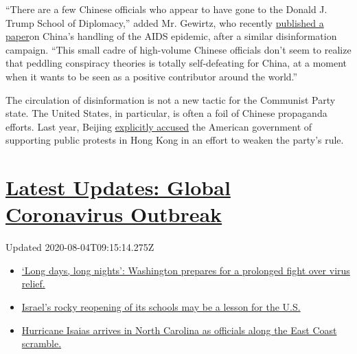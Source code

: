 ``There are a few Chinese officials who appear to have gone to the
Donald J. Trump School of Diplomacy,'' added Mr. Gewirtz, who recently
\href{https://academic.oup.com/past/advance-article/doi/10.1093/pastj/gtz068/5780302}{published
a paper}on China's handling of the AIDS epidemic, after a similar
disinformation campaign. ``This small cadre of high-volume Chinese
officials don't seem to realize that peddling conspiracy theories is
totally self-defeating for China, at a moment when it wants to be seen
as a positive contributor around the world.''

The circulation of disinformation is not a new tactic for the Communist
Party state. The United States, in particular, is often a foil of
Chinese propaganda efforts. Last year, Beijing
\href{https://www.nytimes3xbfgragh.onion/2019/09/05/world/asia/china-hong-kong-protests.html}{explicitly
accused} the American government of supporting public protests in Hong
Kong in an effort to weaken the party's rule.

\hypertarget{latest-updates-global-coronavirus-outbreak}{%
\section{\texorpdfstring{\href{https://www.nytimes3xbfgragh.onion/2020/08/04/world/coronavirus-covid-19.html?action=click\&pgtype=Article\&state=default\&region=MAIN_CONTENT_1\&context=storylines_live_updates}{Latest
Updates: Global Coronavirus
Outbreak}}{Latest Updates: Global Coronavirus Outbreak}}\label{latest-updates-global-coronavirus-outbreak}}

Updated 2020-08-04T09:15:14.275Z

\begin{itemize}
\tightlist
\item
  \href{https://www.nytimes3xbfgragh.onion/2020/08/04/world/coronavirus-covid-19.html?action=click\&pgtype=Article\&state=default\&region=MAIN_CONTENT_1\&context=storylines_live_updates\#link-6b644638}{`Long
  days, long nights': Washington prepares for a prolonged fight over
  virus relief.}
\item
  \href{https://www.nytimes3xbfgragh.onion/2020/08/04/world/coronavirus-covid-19.html?action=click\&pgtype=Article\&state=default\&region=MAIN_CONTENT_1\&context=storylines_live_updates\#link-7af9fca0}{Israel's
  rocky reopening of its schools may be a lesson for the U.S.}
\item
  \href{https://www.nytimes3xbfgragh.onion/2020/08/04/world/coronavirus-covid-19.html?action=click\&pgtype=Article\&state=default\&region=MAIN_CONTENT_1\&context=storylines_live_updates\#link-33bf9168}{Hurricane
  Isaias arrives in North Carolina as officials along the East Coast
  scramble.}
\end{itemize}

